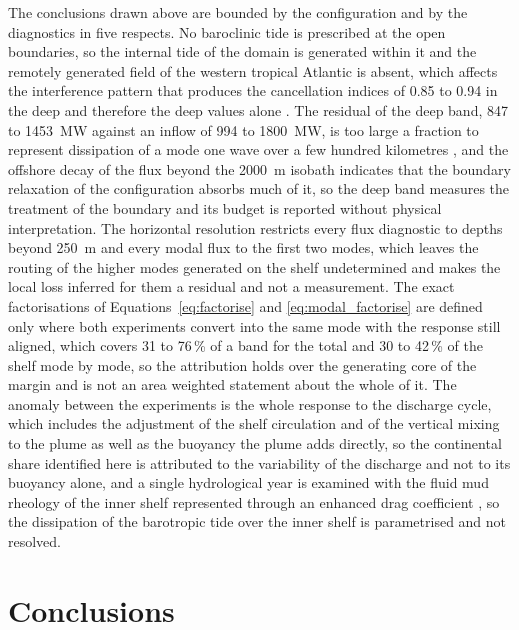\documentclass[a4paper,fleqn]{cas-sc}
\begin{document}
The conclusions drawn above are bounded by the configuration and by the diagnostics in five respects. No baroclinic tide is prescribed at the open boundaries, so the internal tide of the domain is generated within it and the remotely generated field of the western tropical Atlantic is absent, which affects the interference pattern that produces the cancellation indices of 0.85 to 0.94 in the deep and therefore the deep values alone \citep{kerry:2013}. The residual of the deep band, 847 to 1453~MW against an inflow of 994 to 1800~MW, is too large a fraction to represent dissipation of a mode one wave over a few hundred kilometres \citep{vic2019deep}, and the offshore decay of the flux beyond the 2000~m isobath indicates that the boundary relaxation of the configuration absorbs much of it, so the deep band measures the treatment of the boundary and its budget is reported without physical interpretation. The horizontal resolution restricts every flux diagnostic to depths beyond 250~m and every modal flux to the first two modes, which leaves the routing of the higher modes generated on the shelf undetermined and makes the local loss inferred for them a residual and not a measurement. The exact factorisations of Equations~\ref{eq:factorise} and \ref{eq:modal_factorise} are defined only where both experiments convert into the same mode with the response still aligned, which covers 31 to 76\,\% of a band for the total and 30 to 42\,\% of the shelf mode by mode, so the attribution holds over the generating core of the margin and is not an area weighted statement about the whole of it. The anomaly between the experiments is the whole response to the discharge cycle, which includes the adjustment of the shelf circulation and of the vertical mixing to the plume as well as the buoyancy the plume adds directly, so the continental share identified here is attributed to the variability of the discharge and not to its buoyancy alone, and a single hydrological year is examined with the fluid mud rheology of the inner shelf represented through an enhanced drag coefficient \citep{fontes:2008,kineke1996fluid}, so the dissipation of the barotropic tide over the inner shelf is parametrised and not resolved.


\section{Conclusions}
\end{document}
